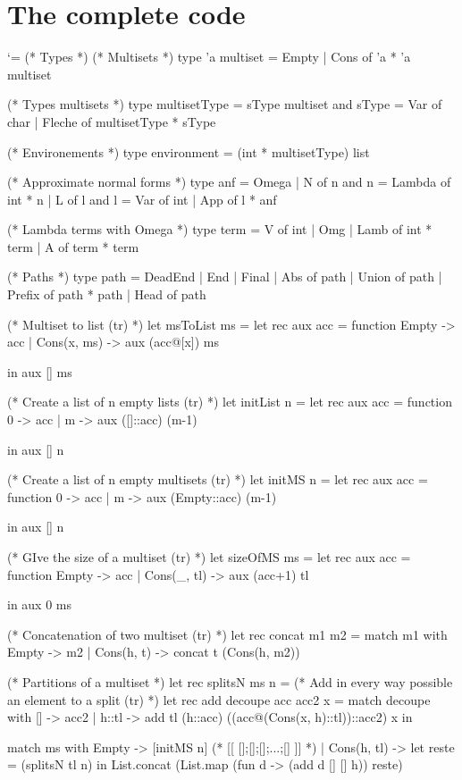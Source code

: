 \documentclass{article}
\let\origlstlisting=\lstlisting
\let\endoriglstlisting=\endlstlisting
\renewenvironment{lstlisting}
{\mathcode`\-=\hyphenmathcode
    \everymath{}\mathsurround=0pt\origlstlisting}
{\endoriglstlisting}
\begin{document}
\section{The complete code}
\begin{lstlisting}
(* Types *)
(* Multisets *)
type 'a multiset =
  Empty
| Cons of 'a * 'a multiset

(* Types multisets *)
type multisetType = sType multiset
and sType = 
  Var of char
| Fleche of multisetType * sType

(* Environements *)
type environment = (int * multisetType) list

(* Approximate normal forms *)
type anf = 
Omega
| N of n
and n = 
  Lambda of int * n
| L of l
and l =
  Var of int
| App of l * anf


(* Lambda terms with Omega *)
type term =
 V of int
| Omg
| Lamb  of int * term
| A of term * term

(* Paths *)
type path = 
DeadEnd
| End
| Final
| Abs of path
| Union of path
| Prefix of path * path
| Head of path

(* Multiset to list (tr) *)
let msToList ms = 
  let rec aux acc = function
    Empty -> acc
  | Cons(x, ms) -> aux (acc@[x]) ms
  
  in aux [] ms

(* Create a list of n empty lists (tr) *)
let initList n = 
  let rec aux acc = function
      0 -> acc
    | m -> aux ([]::acc) (m-1)

  in aux [] n

(* Create a list of n empty multisets (tr) *)
let initMS n = 
  let rec aux acc = function
      0 -> acc
    | m -> aux (Empty::acc) (m-1)

  in aux [] n

(* GIve the size of a multiset (tr) *)
let sizeOfMS ms = 
  let rec aux acc =  function
    Empty -> acc
  | Cons(_, tl) -> aux (acc+1) tl

  in aux 0 ms

(* Concatenation of two multiset (tr) *)
let rec concat m1 m2 = match m1 with
    Empty -> m2
  | Cons(h, t) -> concat t (Cons(h, m2))

(* Partitions of a multiset *)
let rec splitsN ms n = 
   (* Add in every way possible an element to a split (tr) *)
   let rec add decoupe acc acc2 x = match decoupe with 
       [] -> acc2
     | h::tl -> add tl (h::acc) ((acc@(Cons(x, h)::tl))::acc2) x in

  match ms with
    Empty -> [initMS n] (* [[ [];[];[];...;[] ]] *)
  | Cons(h, tl) -> let reste = (splitsN tl n) in
	     List.concat (List.map (fun d -> (add d [] [] h)) reste)


\end{lstlisting}
\end{document}

